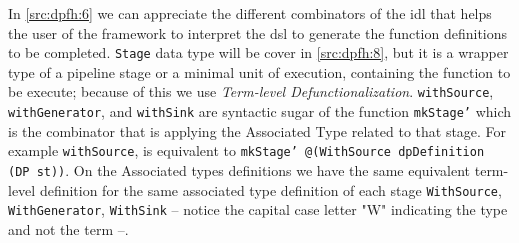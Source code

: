 In \autoref{src:dpfh:6} we can appreciate the different combinators of the \acrshort{idl} that helps the user of the framework to interpret the \acrshort{dsl} to generate the function definitions to be completed.
\texttt{Stage} data type will be cover in \autoref{src:dpfh:8}, but it is a wrapper type of a pipeline stage or a minimal unit of execution, containing the function to be execute; because of this we use \emph{Term-level Defunctionalization}.
\texttt{withSource}, \texttt{withGenerator}, and \texttt{withSink} are syntactic sugar of the function \texttt{mkStage'} which is the combinator that is applying the Associated Type related to that stage. For example \texttt{withSource}, is equivalent to \texttt{mkStage' @(WithSource dpDefinition (DP st))}.
On the Associated types definitions we have the same equivalent term-level definition for the same associated type definition of each stage \texttt{WithSource}, \texttt{WithGenerator}, \texttt{WithSink} -- notice the capital case letter "W" indicating the type and not the term --.

